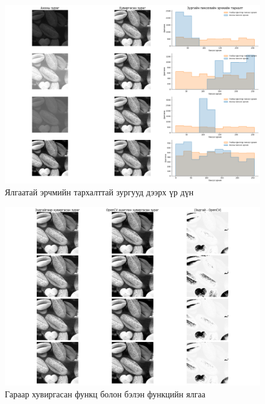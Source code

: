 \documentclass[a4paper]{article}
\begin{document}
\begin{figure}[H]
  \centering
  \includegraphics[scale = 0.30]{global_hist_eq_task_4.png}
  \caption[Intensity 1]{Ялгаатай эрчмийн тархалттай зургууд дээрх үр дүн}
\end{figure}
\begin{figure}[H]
  \centering
  \includegraphics[scale = 0.30]{global_hist_eq_task_5.png}
  \caption[Intensity 1]{Гараар хувиргасан функц болон бэлэн функцийн ялгаа}
\end{figure}
\end{document}
